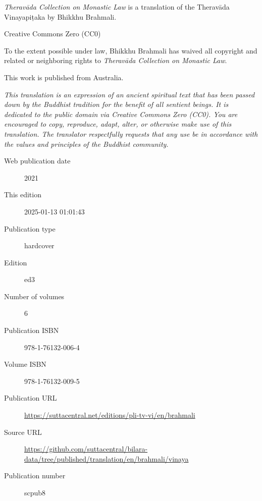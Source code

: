 \documentclass[12pt,openany]{book}%
\begin{document}
\begin{footnotesize}

\textit{Theravāda Collection on Monastic Law} is a translation of the Theravāda Vinayapiṭaka by Bhikkhu Brahmali.

\medskip

Creative Commons Zero (CC0)

To the extent possible under law, Bhikkhu Brahmali has waived all copyright and related or neighboring rights to \textit{Theravāda Collection on Monastic Law}.

\medskip

This work is published from Australia.

\begin{center}
\textit{This translation is an expression of an ancient spiritual text that has been passed down by the Buddhist tradition for the benefit of all sentient beings. It is dedicated to the public domain via Creative Commons Zero (CC0). You are encouraged to copy, reproduce, adapt, alter, or otherwise make use of this translation. The translator respectfully requests that any use be in accordance with the values and principles of the Buddhist community.}
\end{center}

\medskip

\begin{description}
    \item[Web publication date] 2021
    \item[This edition] 2025-01-13 01:01:43
    \item[Publication type] hardcover
    \item[Edition] ed3
    \item[Number of volumes] 6
    \item[Publication ISBN] 978-1-76132-006-4
    \item[Volume ISBN] 978-1-76132-009-5
    \item[Publication URL] \href{https://suttacentral.net/editions/pli-tv-vi/en/brahmali}{https://suttacentral.net/editions/pli-tv-vi/en/brahmali}
    \item[Source URL] \href{https://github.com/suttacentral/bilara-data/tree/published/translation/en/brahmali/vinaya}{https://github.com/suttacentral/bilara-data/tree/published/translation/en/brahmali/vinaya}
    \item[Publication number] scpub8
\end{description}

\medskip


\end{footnotesize}
\end{document}
